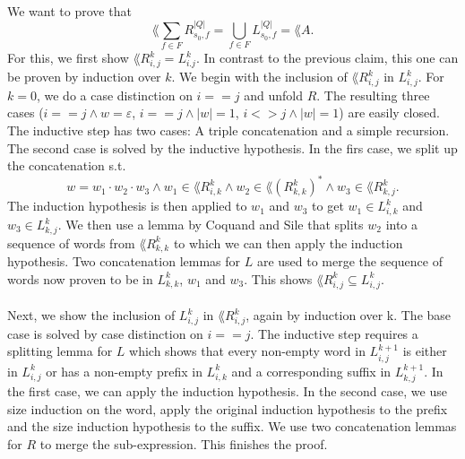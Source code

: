 \documentclass[11pt,a4paper,oneside]{book}
\begin{document}
                    \paragraph{}
                        We want to prove that 
                        \[
                            \lang{\sum\limits_{f \in F} R^{|Q|}_{s_0, f}} = \bigcup\limits_{f \in F} L^{|Q|}_{s_0, f} = \lang{A}.
                        \]
                        For this, we first show $\lang{R^k_{i,j}} = L^k_{i.j}$. In contrast to the previous claim, this one can be proven by induction over $k$. We begin with the inclusion of $\lang{R^k_{i,j}}$ in $L^k_{i,j}$. For $k=0$, we do a case distinction on $i==j$ and unfold $R$. The resulting three cases ($i==j \wedge w=\varepsilon$, $i==j \wedge |w|=1$, $i<>j \wedge |w|=1$) are easily closed. 
                        The inductive step has two cases: A triple concatenation and a simple recursion. 
                        The second case is solved by the inductive hypothesis.
                        In the firs case, we split up the concatenation s.t.
                        \[
                            w = w_1 \cdot w_2 \cdot w_3 
                            \wedge w_1 \in \lang{R^k_{i,k}} 
                            \wedge w_2 \in \lang{(R^k_{k,k})^*} 
                            \wedge w_3 \in \lang{R^k_{k,j}}.
                        \]
                        The induction hypothesis is then applied to $w_1$ and $w_3$ to get $w_1 \in L^k_{i,k}$ and $w_3 \in L^k_{k,j}$.
                        We then use a lemma by Coquand and Sile that splits $w_2$ into a sequence of words from $\lang{R^k_{k,k}}$ to which we can then apply the induction hypothesis. 
                        Two concatenation lemmas for $L$ are used to merge the sequence of words now proven to be in $L^k_{k,k}$,
                        $w_1$ and $w_3$. This shows $\lang{R^k_{i,j}} \subseteq L^k_{i,j}$.

                        \paragraph{}
                            Next, we show the inclusion of $L^k_{i,j}$ in $\lang{R^k_{i,j}}$, again by induction over k. The base case is solved by case distinction on $i==j$. The inductive step requires a splitting lemma for $L$ which shows that every non-empty word in $L^{k+1}_{i,j}$ is either in $L^k_{i,j}$ or has a non-empty prefix in $L^k_{i,k}$ and a corresponding suffix in $L^{k+1}_{k,j}$. In the first case, we can apply the induction hypothesis. In the second case, we use size induction on the word, apply the original induction hypothesis to the prefix and the size induction hypothesis to the suffix. We use two concatenation lemmas for $R$ to merge the sub-expression. This finishes the proof.
                            
\end{document}
